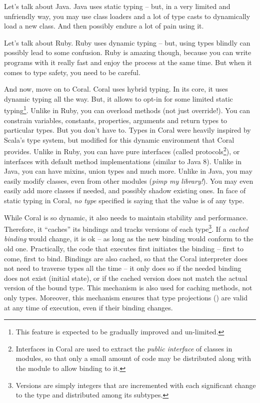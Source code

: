 Let's talk about Java. Java uses static typing -- but, in a very limited and unfriendly way, you may use class loaders and a lot of type casts to dynamically load a new class. And then possibly endure a lot of pain using it. 

Let's talk about Ruby. Ruby uses dynamic typing -- but, using types blindly can possibly lead to some confusion. Ruby is amazing though, because you can write programs with it really fast and enjoy the process at the same time. But when it comes to type safety, you need to be careful. 

And now, move on to Coral. Coral uses hybrid typing. In its core, it uses dynamic typing all the way. But, it allows to opt-in for some limited static typing\footnote{This feature is expected to be gradually improved and un-limited.}. Unlike in Ruby, you can overload methods (not just override!). You can constrain variables, constants, properties, arguments and return types to particular types. But you don't have to. Types in Coral were heavily inspired by Scala's type system, but modified for this dynamic environment that Coral provides. Unlike in Ruby, you can have pure interfaces (called protocols\footnote{Interfaces in Coral are used to extract the \textit{public interface} of classes in modules, so that only a small amount of code may be distributed along with the module to allow binding to it.}), or interfaces with default method implementations (similar to Java 8). Unlike in Java, you can have mixins, union types and much more. Unlike in Java, you may easily modify classes, even from other modules (\textit{pimp my library!}). You may even easily add more classes if needed, and possibly shadow existing ones. In face of static typing in Coral, \textit{no type} specified is saying that the value is of any type. 

While Coral is so dynamic, it also needs to maintain stability and performance. Therefore, it ``caches'' its bindings and tracks versions of each type\footnote{Versions are simply integers that are incremented with each significant change to the type and distributed among its subtypes.}. If a \textit{cached binding} would change, it is ok -- as long as the new binding would conform to the old one. Practically, the code that executes first initiates the binding -- first to come, first to bind. Bindings are also cached, so that the Coral interpreter does not need to traverse types all the time -- it only does so if the needed binding does not exist (initial state), or if the cached version does not match the actual version of the bound type. This mechanism is also used for caching methods, not only types. Moreover, this mechanism ensures that type projections () are valid at any time of execution, even if their binding changes. 

